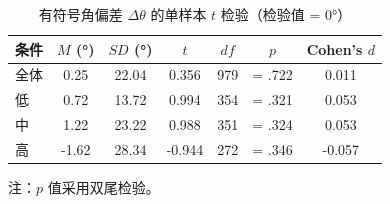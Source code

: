 \begin{table}[htbp]
  \centering
  \caption{有符号角偏差 $\Delta\theta$ 的单样本 $t$ 检验（检验值 = 0°）}
  \label{tab:infer-ttest}
  \begin{tabular}{lcccccc}
    \toprule
    条件 & $M$ (°) & $SD$ (°) & $t$ & $df$ & $p$ & Cohen's $d$ \\
    \midrule
    全体 & 0.25 & 22.04 & 0.356 & 979 & = .722 & 0.011 \\
    低 & 0.72 & 13.72 & 0.994 & 354 & = .321 & 0.053 \\
    中 & 1.22 & 23.22 & 0.988 & 351 & = .324 & 0.053 \\
    高 & -1.62 & 28.34 & -0.944 & 272 & = .346 & -0.057 \\
    \bottomrule
  \end{tabular}
  \begin{flushleft}
    \footnotesize 注：$p$ 值采用双尾检验。
  \end{flushleft}
\end{table}
